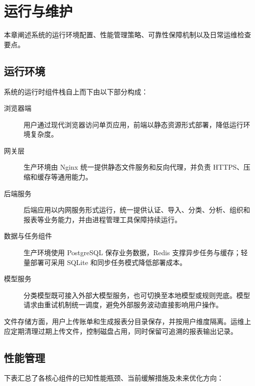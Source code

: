 \chapter{运行与维护}

本章阐述系统的运行环境配置、性能管理策略、可靠性保障机制以及日常运维检查要点。

\section{运行环境}

系统的运行时组件栈自上而下由以下部分构成：

\begin{description}
  \item[浏览器端] 用户通过现代浏览器访问单页应用，前端以静态资源形式部署，降低运行环境复杂度。
  \item[网关层] 生产环境由 Nginx 统一提供静态文件服务和反向代理，并负责 HTTPS、压缩和缓存等通用能力。
  \item[后端服务] 后端应用以内网服务形式运行，统一提供认证、导入、分类、分析、组织和报表等业务能力，并由进程管理工具保障持续运行。
  \item[数据与任务组件] 生产环境使用 PostgreSQL 保存业务数据，Redis 支撑异步任务与缓存；轻量部署可采用 SQLite 和同步任务模式降低部署成本。
  \item[模型服务] 分类模型既可接入外部大模型服务，也可切换至本地模型或规则兜底。模型请求由重试机制统一调度，避免外部服务波动直接影响用户操作。
\end{description}

文件存储方面，用户上传账单和生成报表分目录保存，并按用户维度隔离。运维上应定期清理过期上传文件，控制磁盘占用，同时保留可追溯的报表输出记录。

\section{性能管理}

下表汇总了各核心组件的已知性能瓶颈、当前缓解措施及未来优化方向：

